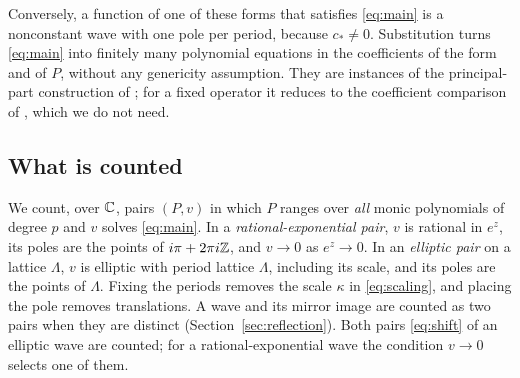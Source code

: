 Conversely, a function of one of these forms that satisfies
\eqref{eq:main} is a nonconstant wave with one pole per period, because
\(c_\ast\ne0\). Substitution turns \eqref{eq:main} into finitely many
polynomial equations in the coefficients of the form and of \(P\),
without any genericity assumption. They are instances of the
principal-part construction of
\citet{DeminaKudryashov2011,DeminaKudryashovElliptic2011}; for a fixed
operator it reduces to the coefficient comparison of
\citet{DeminaKudryashov2014}, which we do not need.

\subsection{What is counted}

We count, over \(\mathbb C\), pairs \((P,v)\) in which \(P\) ranges over
\emph{all} monic polynomials of degree \(p\) and \(v\) solves
\eqref{eq:main}. In a \emph{rational-exponential pair}, \(v\) is
rational in \(e^z\), its poles are the points of \(i\pi+2\pi i\mathbb Z\), and
\(v\to0\) as \(e^z\to0\). In an \emph{elliptic pair} on a lattice
\(\Lambda\), \(v\) is elliptic with period lattice \(\Lambda\), including
its scale, and its poles are the points of \(\Lambda\). Fixing the
periods removes the scale \(\kappa\) in \eqref{eq:scaling}, and placing
the pole removes translations. A wave and its mirror image are counted
as two pairs when they are distinct (Section~\ref{sec:reflection}). Both
pairs \eqref{eq:shift} of an elliptic wave are counted; for a
rational-exponential wave the condition \(v\to0\) selects one of them.
